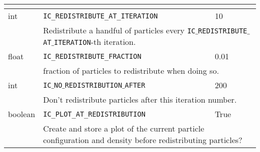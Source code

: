 \begin{tabular}{p{1.2cm} p{7cm} p{1.2cm} p{4cm}}
{		}\\ 
\hline 
int & \verb|IC_REDISTRIBUTE_AT_ITERATION| & 10 & \\ [.5em]
	& \multicolumn{3}{p{12.2cm}}{
		Redistribute a handful of particles every \texttt{IC$\_$REDISTRIBUTE$\_$AT$\_$ITERATION}-th iteration. 
		}\\ 
\hline 
float & \verb|IC_REDISTRIBUTE_FRACTION| & 0.01 & \\[.5em] 
	& \multicolumn{3}{p{12.2cm}}{
		fraction of particles to redistribute when doing so.  
		}\\ 
\hline 
int & \texttt{IC$\_$NO$\_$REDISTRIBUTION$\_$AFTER} & 200 & \\[.5em] 
	& \multicolumn{3}{p{12.2cm}}{
		Don't redistribute particles after this iteration number.
		} \\ 
\hline 
boolean & \verb|IC_PLOT_AT_REDISTRIBUTION| & True & \\ [.5em]
	& \multicolumn{3}{p{12.2cm}}{
		Create and store a plot of the current particle configuration and density before redistributing particles?
		} \\
\end{tabular} 